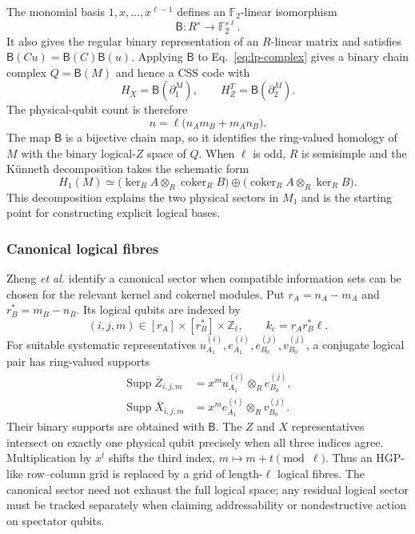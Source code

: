 \documentclass[11pt]{article}
\newcommand{\F}{\mathbb{F}}
\newcommand{\B}{\mathsf{B}}
\newcommand{\coker}{\operatorname{coker}}
\newcommand{\Supp}{\operatorname{Supp}}
\begin{document}
The monomial basis $1,x,\ldots,x^{\ell-1}$ defines an $\F_2$-linear
isomorphism
\begin{equation}
  \B:R^s\longrightarrow\F_2^{s\ell}.
  \label{eq:binarization}
\end{equation}
It also gives the regular binary representation of an $R$-linear matrix and
satisfies $\B(Cu)=\B(C)\B(u)$. Applying $\B$ to
Eq.~\eqref{eq:lp-complex} gives a binary chain complex $Q=\B(M)$ and hence a
CSS code with
\begin{equation}
  H_X=\B(\partial_1^M),
  \qquad
  H_Z^T=\B(\partial_2^M).
  \label{eq:lp-css-checks}
\end{equation}
The physical-qubit count is therefore
\begin{equation}
  n=\ell\bigl(n_A m_B+m_A n_B\bigr).
  \label{eq:lp-length}
\end{equation}
The map $\B$ is a bijective chain map, so it identifies the ring-valued
homology of $M$ with the binary logical-$Z$ space of $Q$. When $\ell$ is odd,
$R$ is semisimple and the K\"unneth decomposition takes the schematic form
\begin{equation}
  H_1(M)\simeq
  \bigl(\ker_R A\otimes_R\coker_R B\bigr)
  \oplus
  \bigl(\coker_R A\otimes_R\ker_R B\bigr).
  \label{eq:kunneth}
\end{equation}
This decomposition explains the two physical sectors in $M_1$ and is the
starting point for constructing explicit logical bases.

\subsubsection{Canonical logical fibres}

Zheng \emph{et al.} identify a canonical sector when compatible information
sets can be chosen for the relevant kernel and cokernel modules. Put
$r_A=n_A-m_A$ and $r_B^*=m_B-n_B$. Its logical qubits are indexed by
\begin{equation}
  (i,j,m)\in [r_A]\times[r_B^*]\times\mathbb Z_\ell,
  \qquad
  k_{\mathrm c}=r_A r_B^*\ell.
  \label{eq:canonical-index}
\end{equation}
For suitable systematic representatives
$u_{A_1}^{(i)},e_{A_1}^{(i)},e_{B_0}^{(j)},v_{B_0}^{(j)}$, a conjugate logical
pair has ring-valued supports
\begin{align}
  \Supp\overline Z_{i,j,m}
  &=x^m u_{A_1}^{(i)}\otimes_R e_{B_0}^{(j)},
  \label{eq:canonical-z}\\
  \Supp\overline X_{i,j,m}
  &=x^m e_{A_1}^{(i)}\otimes_R v_{B_0}^{(j)}.
  \label{eq:canonical-x}
\end{align}
Their binary supports are obtained with $\B$. The $Z$ and $X$ representatives
intersect on exactly one physical qubit precisely when all three indices agree.
Multiplication by $x^t$ shifts the third index,
$m\mapsto m+t\pmod\ell$. Thus an HGP-like row--column grid is replaced by a
grid of length-$\ell$ logical fibres. The canonical sector need not exhaust
the full logical space; any residual logical sector must be tracked separately
when claiming addressability or nondestructive action on spectator qubits.
\end{document}
